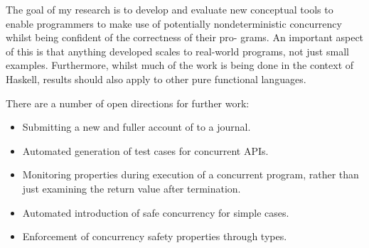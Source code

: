 The goal of my research is to develop and evaluate new conceptual
tools to enable programmers to make use of potentially
nondeterministic concurrency whilst being confident of the correctness
of their pro- grams. An important aspect of this is that anything
developed scales to real-world programs, not just small
examples. Furthermore, whilst much of the work is being done in the
context of Haskell, results should also apply to other pure functional
languages.

There are a number of open directions for further work:

\begin{itemize}
\item Submitting a new and fuller account of \dejafu{} to a journal.

\item Automated generation of test cases for concurrent APIs.

\item Monitoring properties during execution of a concurrent program,
  rather than just examining the return value after termination.

\item Automated introduction of safe concurrency for simple cases.

\item Enforcement of concurrency safety properties through types.
\end{itemize}
